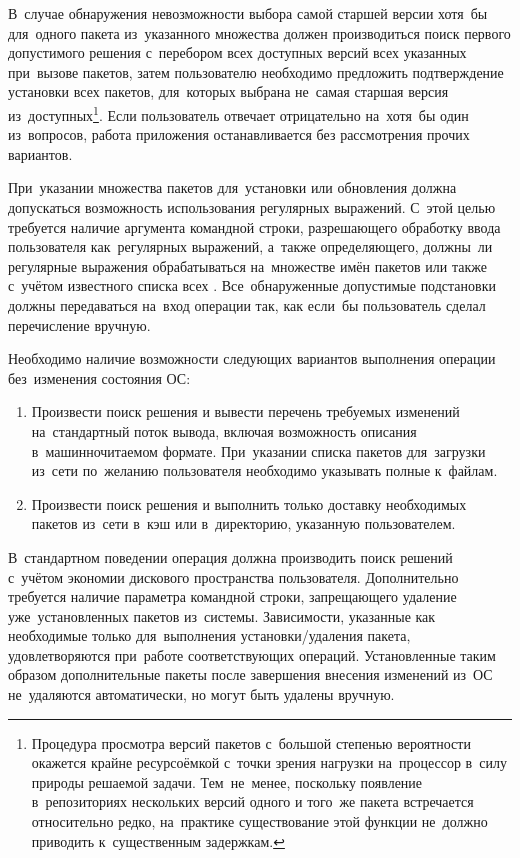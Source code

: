В~случае обнаружения невозможности выбора самой старшей версии хотя~бы для~одного пакета из~указанного множества
должен производиться поиск первого допустимого решения с~перебором всех доступных версий всех указанных при~вызове пакетов,
затем пользователю необходимо предложить подтверждение установки всех пакетов, для~которых выбрана не~самая старшая версия из~доступных\footnote{
Процедура просмотра версий пакетов с~большой степенью вероятности окажется крайне ресурсоёмкой с~точки зрения нагрузки на~процессор в~силу природы решаемой задачи.
Тем~не~менее, поскольку появление в~репозиториях нескольких версий одного и того~же пакета встречается относительно редко,
на~практике существование этой функции не~должно приводить к~существенным задержкам.
}.
Если пользователь отвечает отрицательно на~хотя~бы один из~вопросов, работа приложения останавливается без рассмотрения прочих вариантов.

При~указании множества пакетов для~установки или обновления  должна допускаться возможность использования регулярных выражений.
С~этой целью требуется наличие аргумента командной строки,  разрешающего обработку ввода пользователя как~регулярных выражений,
а~также определяющего,  должны~ли регулярные выражения обрабатываться на~множестве имён пакетов или также с~учётом известного списка всех .
Все~обнаруженные допустимые подстановки должны передаваться на~вход операции так, как если~бы пользователь сделал перечисление вручную.

Необходимо наличие возможности следующих вариантов выполнения операции без~изменения состояния ОС:

\begin{enumerate}

\item {
Произвести поиск решения и вывести перечень требуемых изменений на~стандартный поток вывода,
включая возможность описания в~машинночитаемом формате.
При~указании списка пакетов для~загрузки из~сети по~желанию пользователя необходимо указывать полные  к~файлам.
}

\item {
Произвести поиск решения и выполнить только доставку необходимых пакетов из~сети в~кэш или в~директорию, указанную пользователем.
}

\end{enumerate}

В~стандартном поведении операция должна производить поиск решений с~учётом экономии дискового пространства пользователя. 
Дополнительно требуется наличие параметра командной строки, запрещающего удаление уже~установленных пакетов из~системы. 
Зависимости, указанные как необходимые только для~выполнения установки/удаления пакета,
удовлетворяются при~работе соответствующих операций.
Установленные таким образом дополнительные пакеты после завершения внесения изменений из~ОС не~удаляются автоматически,
но могут быть удалены вручную.

